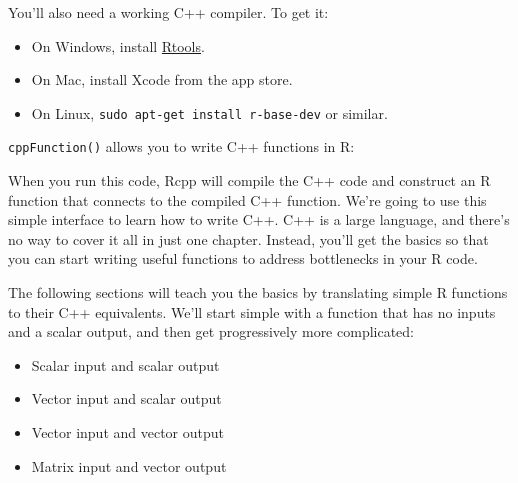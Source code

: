 You'll also need a working C++ compiler. To get it:

\begin{itemize}
\itemsep1pt\parskip0pt
\item
  On Windows, install
  \href{http://cran.r-project.org/bin/windows/Rtools/}{Rtools}.\pagebreak 
\item
  On Mac, install Xcode from the app store.
\item
  On Linux, \texttt{sudo apt-get install r-base-dev} or similar.
\end{itemize}


\texttt{cppFunction()} allows you to write C++ functions in R:

\begin{Shaded}
\begin{Highlighting}[]
\NormalTok{(}
\NormalTok{)}
\NormalTok{(}\NormalTok{, }\NormalTok{, }\NormalTok{)}
\end{Highlighting}
\end{Shaded}

When you run this code, Rcpp will compile the C++ code and construct an
R function that connects to the compiled C++ function. We're going to
use this simple interface to learn how to write C++. C++ is a large
language, and there's no way to cover it all in just one chapter.
Instead, you'll get the basics so that you can start writing useful
functions to address bottlenecks in your R code.

The following sections will teach you the basics by translating simple R
functions to their C++ equivalents. We'll start simple with a function
that has no inputs and a scalar output, and then get progressively more
complicated:

\begin{itemize}
\itemsep1pt\parskip0pt
\item
  Scalar input and scalar output
\item
  Vector input and scalar output
\item
  Vector input and vector output
\item
  Matrix input and vector output
\end{itemize}

